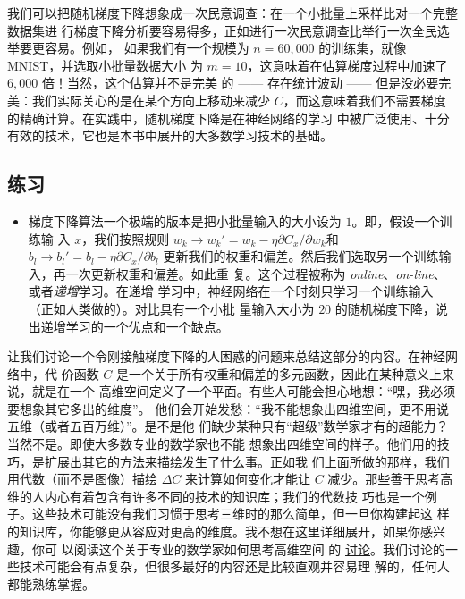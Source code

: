 我们可以把随机梯度下降想象成一次民意调查：在一个小批量上采样比对一个完整数据集进
行梯度下降分析要容易得多，正如进行一次民意调查比举行一次全民选举要更容易。例如，
如果我们有一个规模为 $n = 60,000$ 的训练集，就像 MNIST，并选取小批量数据大小
为 $m = 10$，这意味着在估算梯度过程中加速了 $6,000$ 倍！当然，这个估算并不是完美
的 —— 存在统计波动 —— 但是没必要完美：我们实际关心的是在某个方向上移动来减少
$C$，而这意味着我们不需要梯度的精确计算。在实践中，随机梯度下降是在神经网络的学习
中被广泛使用、十分有效的技术，它也是本书中展开的大多数学习技术的基础。

\subsection*{练习}

\begin{itemize}
\item 梯度下降算法一个极端的版本是把小批量输入的大小设为 $1$。即，假设一个训练输
  入 $x$，我们按照规则 $w_k \rightarrow w_k' = w_k - \eta \partial C_x /
  \partial w_k$和$b_l \rightarrow b_l' = b_l - \eta \partial C_x / \partial b_l$
  更新我们的权重和偏差。然后我们选取另一个训练输入，再一次更新权重和偏差。如此重
  复。这个过程被称为 \emph{online}、\emph{on-line}、或者\emph{递增}学习。在递增
  学习中，神经网络在一个时刻只学习一个训练输入（正如人类做的）。对比具有一个小批
  量输入大小为 $20$ 的随机梯度下降，说出递增学习的一个优点和一个缺点。
\end{itemize}

让我们讨论一个令刚接触梯度下降的人困惑的问题来总结这部分的内容。在神经网络中，代
价函数 $C$ 是一个关于所有权重和偏差的多元函数，因此在某种意义上来说，就是在一个
高维空间定义了一个平面。有些人可能会担心地想：``嘿，我必须要想象其它多出的维度''。
他们会开始发愁：``我不能想象出四维空间，更不用说五维（或者五百万维）''。是不是他
们缺少某种只有``超级''数学家才有的超能力？当然不是。即使大多数专业的数学家也不能
想象出四维空间的样子。他们用的技巧，是扩展出其它的方法来描绘发生了什么事。正如我
们上面所做的那样，我们用代数（而不是图像）描绘 $\Delta C$ 来计算如何变化才能让
$C$ 减少。那些善于思考高维的人内心有着包含有许多不同的技术的知识库；我们的代数技
巧也是一个例子。这些技术可能没有我们习惯于思考三维时的那么简单，但一旦你构建起这
样的知识库，你能够更从容应对更高的维度。我不想在这里详细展开，如果你感兴趣，你可
以阅读这个关于专业的数学家如何思考高维空间
的%
\href{http://mathoverflow.net/questions/25983/intuitive-crutches-for-higher-dimensional-thinking}{
  讨论}。我们讨论的一些技术可能会有点复杂，但很多最好的内容还是比较直观并容易理
解的，任何人都能熟练掌握。

